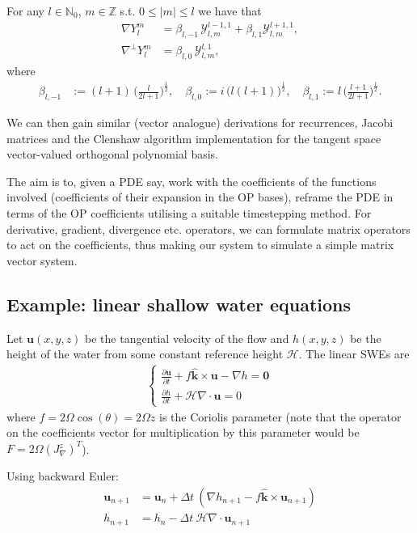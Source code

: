 \documentclass[11pt, oneside]{article}   	%
\newcommand{\half}{\frac{1}{2}}
\newcommand{\Z}{\mathbb{Z}}
\newcommand{\No}{\mathbb{N}_0}
\newcommand{\Ylm}{Y^m_l}
\newcommand{\curlyy}{\bm{\mathcal{Y}}}
\newcommand{\blone}{\beta_{l, 1}}
\newcommand{\blzero}{\beta_{l, 0}}
\newcommand{\blmone}{\beta_{l, -1}}
\newcommand{\unitvec}{\hat{\bm{k}}}
\begin{document}
For any \(l \in \No\), \(m \in \Z\) s.t. \(0 \le |m| \le l\) we have that
\begin{align}
\nabla \Ylm &= \blmone \, \curlyy^{l-1,1}_{l,m} + \blone \curlyy^{l+1,1}_{l,m}, \\
\nabla^\perp \Ylm &= \blzero \, \curlyy^{l,1}_{l,m},
\end{align}
where
\begin{align}
\blmone &:= (l+1) \, \Big(\frac{l}{2l+1}\Big)^\half, \quad
\blzero := i \, \big(l(l+1)\big)^\half, \quad
\blone := l \, \Big(\frac{l+1}{2l+1}\Big)^\half.
\end{align}

We can then gain similar (vector analogue) derivations for recurrences, Jacobi matrices and the Clenshaw algorithm implementation for the tangent space vector-valued orthogonal polynomial basis.

The aim is to, given a PDE say, work with the coefficients of the functions involved (coefficients of their expansion in the OP bases), reframe the PDE in terms of the OP coefficients utilising a suitable timestepping method. For derivative, gradient, divergence etc. operators, we can formulate matrix operators to act on the coefficients, thus making our system to simulate a simple matrix vector system.

\subsection{Example: linear shallow water equations}
Let $\mathbf{u}(x,y,z)$ be the tangential velocity of the flow and $h(x,y,z)$ be the height of the water from some constant reference height $\mathcal{H}$. The linear SWEs are
\begin{align}
\begin{cases}
\frac{\partial \mathbf{u}}{\partial t} + f \unitvec \times \mathbf{u} - \nabla h = \mathbf{0} \\
\frac{\partial h}{\partial t} + \mathcal{H} \nabla \cdot \mathbf{u} = 0
\end{cases}
\end{align}
where $f = 2 \Omega \cos(\theta) =  2 \Omega z$ is the Coriolis parameter (note that the operator on the coefficients vector for multiplication by this parameter would be $F = 2 \Omega (J^z_\nabla)^T$).

Using backward Euler:
\begin{align}
\mathbf{u}_{n+1} &= \mathbf{u}_{n} + \Delta t \: (\nabla h_{n+1} - f \unitvec \times \mathbf{u}_{n+1}) \\
h_{n+1} &= h_n - \Delta t \: \mathcal{H} \nabla \cdot \mathbf{u}_{n+1}
\end{align}
\end{document}
